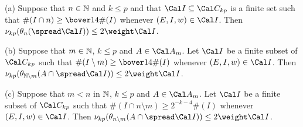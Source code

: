  (a)
Suppose that $n\in\Bbb N$ and $k\le p$ and that
$\Cal I\subseteq\Cal C_{kp}$
is a finite set such that $\#(I\cap n)\ge\bover14\#(I)$
whenever $(E,I,w)\in\Cal I$.
Then $\nu_{kp}(\theta_n(\spread\Cal I))\le 2\weight\Cal I$.

(b) Suppose that $m\in\Bbb N$, $k\le p$ and $A\in\Cal A_m$.   Let
$\Cal I$ be a finite subset of $\Cal C_{kp}$ such that
$\#(I\setminus m)\ge\bover14\#(I)$ whenever $(E,I,w)\in\Cal I$.   Then
$\nu_{kp}(\theta_{\Bbb N\setminus m}(A\cap\spread\Cal I))
\le 2\weight\Cal I$.

(c) Suppose that $m<n$ in $\Bbb N$, $k\le p$ and $A\in\Cal A_m$.   Let
$\Cal I$ be a finite subset of $\Cal C_{kp}$ such that
$\#(I\cap n\setminus m)\ge 2^{-k-4}\#(I)$ whenever $(E,I,w)\in\Cal I$.
Then $\nu_{kp}(\theta_{n\setminus m}(A\cap\spread\Cal I))
\le 2\weight\Cal I$.

